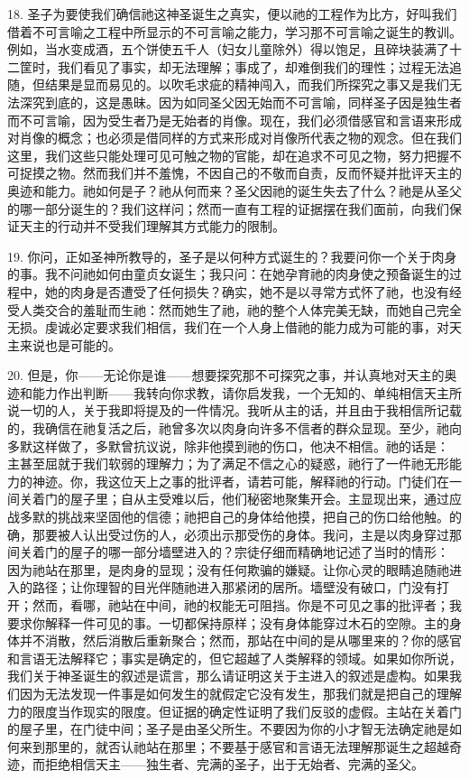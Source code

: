 18. 圣子为要使我们确信祂这神圣诞生之真实，便以祂的工程作为比方，好叫我们借着不可言喻之工程中所显示的不可言喻之能力，学习那不可言喻之诞生的教训。例如，当水变成酒，五个饼使五千人（妇女儿童除外）得以饱足，且碎块装满了十二筐时，我们看见了事实，却无法理解；事成了，却难倒我们的理性；过程无法追随，但结果是显而易见的。以吹毛求疵的精神闯入，而我们所探究之事又是我们无法深究到底的，这是愚昧。因为如同圣父因无始而不可言喻，同样圣子因是独生者而不可言喻，因为受生者乃是无始者的肖像。现在，我们必须借感官和言语来形成对肖像的概念；也必须是借同样的方式来形成对肖像所代表之物的观念。但在我们这里，我们这些只能处理可见可触之物的官能，却在追求不可见之物，努力把握不可捉摸之物。然而我们并不羞愧，不因自己的不敬而自责，反而怀疑并批评天主的奥迹和能力。祂如何是子？祂从何而来？圣父因祂的诞生失去了什么？祂是从圣父的哪一部分诞生的？我们这样问；然而一直有工程的证据摆在我们面前，向我们保证天主的行动并不受我们理解其方式能力的限制。\par

19. 你问，正如圣神所教导的，圣子是以何种方式诞生的？我要问你一个关于肉身的事。我不问祂如何由童贞女诞生；我只问：在她孕育祂的肉身使之预备诞生的过程中，她的肉身是否遭受了任何损失？确实，她不是以寻常方式怀了祂，也没有经受人类交合的羞耻而生祂：然而她生了祂，祂的整个人体完美无缺，而她自己完全无损。虔诚必定要求我们相信，我们在一个人身上借祂的能力成为可能的事，对天主来说也是可能的。\par

20. 但是，你——无论你是谁——想要探究那不可探究之事，并认真地对天主的奥迹和能力作出判断——我转向你求教，请你启发我，一个无知的、单纯相信天主所说一切的人，关于我即将提及的一件情况。我听从主的话，并且由于我相信所记载的，我确信在祂复活之后，祂曾多次以肉身向许多不信者的群众显现。至少，祂向多默这样做了，多默曾抗议说，除非他摸到祂的伤口，他决不相信。祂的话是：  主甚至屈就于我们软弱的理解力；为了满足不信之心的疑惑，祂行了一件祂无形能力的神迹。你，我这位天上之事的批评者，请若可能，解释祂的行动。门徒们在一间关着门的屋子里；自从主受难以后，他们秘密地聚集开会。主显现出来，通过应战多默的挑战来坚固他的信德；祂把自己的身体给他摸，把自己的伤口给他触。的确，那要被人认出受过伤的人，必须出示那受伤的身体。我问，主是以肉身穿过那间关着门的屋子的哪一部分墙壁进入的？宗徒仔细而精确地记述了当时的情形： 因为祂站在那里，是肉身的显现；没有任何欺骗的嫌疑。让你心灵的眼睛追随祂进入的路径；让你理智的目光伴随祂进入那紧闭的居所。墙壁没有破口，门没有打开；然而，看哪，祂站在中间，祂的权能无可阻挡。你是不可见之事的批评者；我要求你解释一件可见的事。一切都保持原样；没有身体能穿过木石的空隙。主的身体并不消散，然后消散后重新聚合；然而，那站在中间的是从哪里来的？你的感官和言语无法解释它；事实是确定的，但它超越了人类解释的领域。如果如你所说，我们关于神圣诞生的叙述是谎言，那么请证明这关于主进入的叙述是虚构。如果我们因为无法发现一件事是如何发生的就假定它没有发生，那我们就是把自己的理解力的限度当作现实的限度。但证据的确定性证明了我们反驳的虚假。主站在关着门的屋子里，在门徒中间；圣子是由圣父所生。不要因为你的小才智无法确定祂是如何来到那里的，就否认祂站在那里；不要基于感官和言语无法理解那诞生之超越奇迹，而拒绝相信天主——独生者、完满的圣子，出于无始者、完满的圣父。\par

